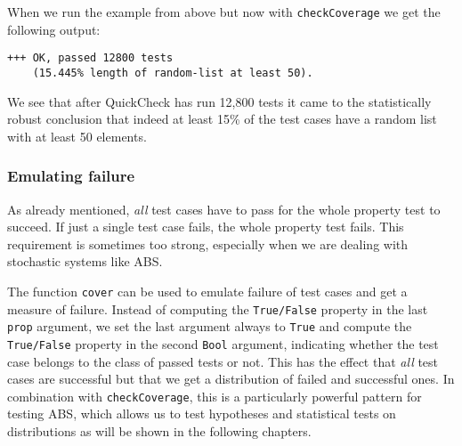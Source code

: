 When we run the example from above but now with \texttt{checkCoverage} we get the following output:

\begin{verbatim}
+++ OK, passed 12800 tests 
    (15.445% length of random-list at least 50).
\end{verbatim}

We see that after QuickCheck has run 12,800 tests it came to the statistically robust conclusion that indeed at least 15\% of the test cases have a random list with at least 50 elements. 

\subsubsection{Emulating failure}
As already mentioned, \textit{all} test cases have to pass for the whole property test to succeed. If just a single test case fails, the whole property test fails. This requirement is sometimes too strong, especially when we are dealing with stochastic systems like ABS.

The function \texttt{cover} can be used to emulate failure of test cases and get a measure of failure. Instead of computing the \texttt{True/False} property in the last \texttt{prop} argument, we set the last argument always to \texttt{True} and compute the \texttt{True/False} property in the second \texttt{Bool} argument, indicating whether the test case belongs to the class of passed tests or not. This has the effect that \textit{all} test cases are successful but that we get a distribution of failed and successful ones. In combination with \texttt{checkCoverage}, this is a particularly powerful pattern for testing ABS, which allows us to test hypotheses and statistical tests on distributions as will be shown in the following chapters.
